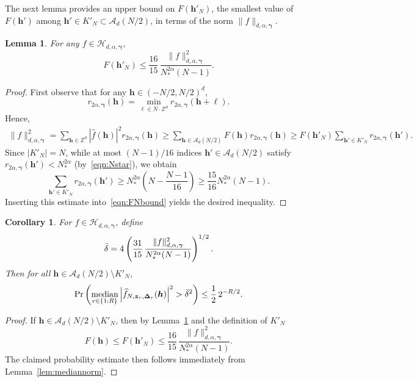 \documentclass[a4paper,11pt]{article}
\newtheorem{lemma}[theorem]{Lemma}
\newtheorem{corollary}[theorem]{Corollary}
\newcommand{\bsh}{\boldsymbol{h}}
\newcommand{\bsl}{\boldsymbol{\ell}}
\newcommand{\bsz}{\boldsymbol{z}}
\newcommand{\bsgamma}{\boldsymbol{\gamma}}
\newcommand{\bsDelta}{\boldsymbol{\Delta}}
\newcommand{\ZZ}{\mathbb{Z}}
\newcommand{\Hcal}{\mathcal{H}}
\begin{document}
The next lemma provides an upper bound on $F(\bsh'_N)$, the smallest value of $F(\bsh')$ among $\bsh'\in K'_N\subset \mathcal{A}_d(N/2)$, in terms of the norm $\|f\|_{d,\alpha,\bsgamma}$.

\begin{lemma}\label{lem:FNbound}
    For any $f\in \Hcal_{d,\alpha,\bsgamma}$,
    \[
      F(\bsh'_N)\leq \frac{16}{15}\,\frac{\|f\|^2_{d,\alpha,\bsgamma}}{N_*^{2\alpha}(N-1)}.
    \]
\end{lemma}
\begin{proof}
First observe that for any $\bsh\in (-N/2,N/2)^d$,
\[
   r_{2\alpha, \bsgamma}(\bsh)=\min_{\bsl\in N\cdot \ZZ^d} r_{2\alpha, \bsgamma}(\bsh+\bsl).
\]
Hence,
\begin{align}\label{eqn:FNbound}
    \|f\|^2_{d,\alpha,\bsgamma}=\sum_{\bsh\in\ZZ^d} |\widehat{f}({\bsh})|^2 r_{2\alpha,\bsgamma}(\bsh)\geq \sum_{\bsh\in \mathcal{A}_d(N/2)} F(\bsh)  r_{2\alpha,\bsgamma}(\bsh)\geq F(\bsh'_N)\sum_{\bsh'\in K'_N}r_{2\alpha,\bsgamma}(\bsh').
\end{align}
Since $|K'_N|=N$, while at most $(N-1)/16$ indices $\bsh'\in \mathcal{A}_d(N/2)$ satisfy
$r_{2\alpha,\bsgamma}(\bsh') < N_*^{2\alpha}$ (by~\eqref{eqn:Nstar}), we obtain
\[
   \sum_{\bsh'\in K'_N}r_{2\alpha,\bsgamma}(\bsh')
   \ge N_*^{2\alpha}\left(N - \frac{N-1}{16}\right)
   \ge \frac{15}{16} N_*^{2\alpha}(N-1).
\]
Inserting this estimate into~\eqref{eqn:FNbound} yields the desired inequality.
\end{proof}

\begin{corollary}\label{cor:nonKN}
For $f\in \Hcal_{d,\alpha,\bsgamma}$, define
\[
   \Bar{\delta}=4\left(\frac{31}{15}\,\frac{\|f\|^2_{d,\alpha,\bsgamma}}{N_*^{2\alpha}(N-1)}\right)^{1/2}.
\]
Then for all $\bsh\in \mathcal{A}_d(N/2)\setminus K'_N$,
\[
   \Pr\left( \operatorname*{median}_{r\in\{1{:}R\}}
     \left| \widehat{f}_{N,\bsz_r,\bsDelta_r}(\bsh)\right|^2
     > \Bar{\delta}^2 \right) \le \frac{1}{2}\,2^{-R/2}.
\]
\end{corollary}
\begin{proof}
If $\bsh\in \mathcal{A}_d(N/2)\setminus K'_N$, then by Lemma~\ref{lem:FNbound} and the definition of $K'_N$
\[
   F(\bsh) \leq F(\bsh'_N)
   \leq \frac{16}{15}\,\frac{\|f\|^2_{d,\alpha,\bsgamma}}{N_*^{2\alpha}(N-1)}.
\]
The claimed probability estimate then follows immediately from Lemma~\ref{lem:mediannorm}.
\end{proof}
\end{document}
